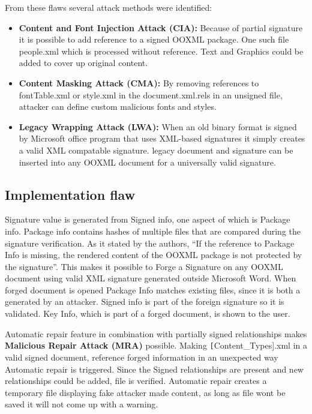 \documentclass[conference]{IEEEtran}
\begin{document}
        From these flaws several attack methods were identified:
        \begin{itemize}
            \item  \textbf{Content and Font Injection Attack (CIA):} Because of partial signature it is possible to add reference to a signed OOXML package. One such file people.xml which is processed without reference. Text and Graphics could be added to cover up original content.
            \item  \textbf{Content Masking Attack (CMA):} By removing references to fontTable.xml or style.xml in the document.xml.rels in an unsigned file, attacker can define custom malicious fonts and styles.
            \item  \textbf{Legacy Wrapping Attack (LWA):} When an old binary format is signed by Microsoft office program that uses XML-based signatures it simply creates a valid XML compatable signature. legacy document and signature can be inserted into any OOXML document for a universally valid signature.
        \end{itemize}
    
    \subsection{Implementation flaw}
        Signature value is generated from Signed info, one aspect of which is Package info.
        Package info contains hashes of multiple files that are compared during the signature verification. As it stated by the authors, \enquote{If the reference to
        Package Info is missing, the rendered content of the OOXML
        package is not protected by the signature}. This makes it possible to Forge a Signature on any OOXML document using valid XML signature generated outside Microsoft Word. When forged document is opened Package Info matches existing files, since it is both a generated by an attacker. Signed info is part of the foreign signature so it is validated. Key Info, which is part of a forged document, is shown to the user.
        
        Automatic repair feature in combination with partially signed relationships makes \textbf{ Malicious Repair Attack (MRA)} possible. Making \texttt[Content\_Types].xml in a valid signed document, reference forged information in an unexpected way Automatic repair is triggered. Since the Signed relationships are present and new relationships could be added, file is verified. Automatic repair creates a temporary file displaying fake attacker made content, as long as file wont be saved it will not come up with a warning.
    
\end{document}
